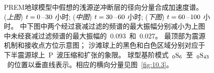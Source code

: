 \begin{figure}
\begin{center}
\end{center}
\caption[thrust spect2]{
\label{fig:10.5}
PREM地球模型中假想的浅源逆冲断层的径向分量合成加速度谱。
({\em 上图\/}) $t=0\hspace{0.2 mm}$--$\hspace{0.2 mm}30$
小时; 
({\em 中图\/}) $t=30\hspace{0.2 mm}$--$\hspace{0.2 mm}60$
小时; ({\em 下图\/}) $t=60\hspace{0.2 mm}$--$\hspace{0.2 mm}100$
小时。
中下图中两个经过衰减过滤的频谱的最大振幅分别减小为上图中未经衰减过滤频谱的最大振幅的~0.093~和~0.027。
最顶部为震源机制和接收点方位示意图；
沙滩球上的黑色和白色区域分别对应于下半震源球上~P~波压缩和扩张的象限。
球型基阶模式~${}_0{\rm S}_6$~至~${}_0{\rm S}_{43}$~的位置以垂直线表示。相应的横向分量见图~\protect\ref{fig:10.3}。}
\end{figure}
